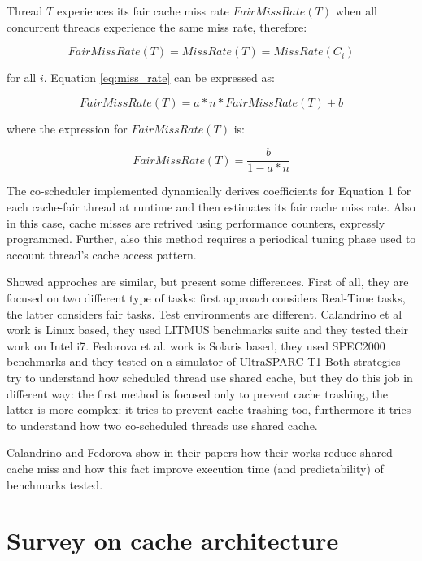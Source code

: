 Thread $T$ experiences its fair cache miss rate $FairMissRate(T)$ when all concurrent threads experience the same miss rate, therefore:

\begin{equation}
	FairMissRate(T) = MissRate(T) = MissRate(C_i)
\end{equation}

for all $i$. Equation \ref{eq:miss_rate} can be expressed as:

\begin{equation}
	FairMissRate(T ) = a*n*FairMissRate(T) + b 
\end{equation}

where the expression for $FairMissRate(T)$ is:

\begin{equation}
	FairMissRate(T) = \frac {b}{1-a*n}
\end{equation}

The co-scheduler implemented dynamically derives coefficients for Equation 1 for each cache-fair thread at runtime and then estimates its fair cache 
miss rate. Also in this case, cache misses are retrived using performance counters, expressly programmed. Further, also this method requires a periodical 
tuning phase used to account thread's cache access pattern.

Showed approches are similar, but present some differences.
First of all, they are focused on two different type of tasks: first approach considers Real-Time tasks, the latter considers fair tasks.
Test environments are different. Calandrino et al work is Linux based, they used LITMUS benchmarks suite and they tested their work on Intel i7.
Fedorova et al. work is Solaris based, they used SPEC2000 benchmarks and they tested on a simulator of UltraSPARC T1
Both strategies try to understand how scheduled thread use shared cache, but they do this job in different way: the first method is focused only
to prevent cache trashing, the latter is more complex: it tries to prevent cache trashing too, furthermore it tries to understand how two co-scheduled
threads use shared cache.

Calandrino and Fedorova show in their papers how their works reduce shared cache miss and how this fact improve execution time (and predictability)
of benchmarks tested.

\section{Survey on cache architecture}
\label{sec:s1}

